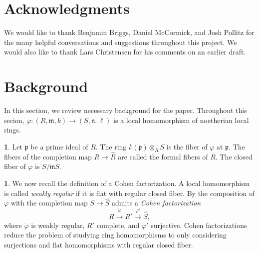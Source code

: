 \documentclass{amsart}
\theoremstyle{definition}
\newtheorem{chunk}[theorem]{}
\newcommand{\m}{\mathfrak{m}}
\newcommand{\n}{\mathfrak{n}}
\begin{document}
\section*{Acknowledgments}
We would like to thank Benjamin Briggs, Daniel McCormick, and Josh Pollitz for the many helpful conversations and suggestions throughout
this project. We would also like to thank Lars Christensen for his comments on an earlier draft.
















\section{Background}
In this section, we review necessary background for the paper. Throughout this secion, $\varphi\colon(R,\m,k)\rightarrow (S,\n,\ell)$ is a local homomorphism of noetherian local rings. 
\begin{chunk} 
    Let $\mathfrak{p}$ be a prime ideal of $R$. The ring $k(\mathfrak{p})\otimes_{R}S$ is the fiber of $\varphi$ at $\mathfrak{p}$. The fibers of the completion map $R\rightarrow \widehat{R}$ are called the formal fibers of $R$. The closed fiber of $\varphi$ is $S/\mathfrak{m}S$.
\end{chunk}

\begin{chunk}
    We now recall the definition of a Cohen factorization. A local homomorphism is called \textit{weakly regular} if it is flat with regular closed fiber. By \cite[Theorem 1.1]{Avramov/Foxby/Herzog:1994} the composition of $\varphi$ with the completion map $S\rightarrow \widehat{S}$ admits a \textit{Cohen factorization}
    \[R\xrightarrow{\dot{\varphi}} R'\xrightarrow{\varphi'} \widehat{S},\]
    where $\dot{\varphi}$ is weakly regular, $R'$ complete, and $\varphi'$ surjective. Cohen factorizations reduce the problem of studying ring homomorphisms to only considering surjections and flat homomorphisms with regular closed fiber.
\end{chunk}
\end{document}
